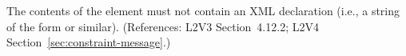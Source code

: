 The contents of the  element must not contain an XML
declaration (i.e., a string of the form  or similar).  (References: L2V3
Section~4.12.2; L2V4 Section~\ref{sec:constraint-message}.)
